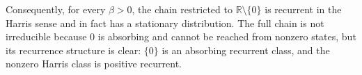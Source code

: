 \documentclass[11pt]{article}
\newcommand{\1}{\mathbf{1}}
\begin{document}
Consequently, for every $\beta>0$, the chain restricted to
$\mathbb{R}\setminus\{0\}$ is recurrent in the Harris sense and in fact
has a stationary distribution.  The full chain is not irreducible
because $0$ is absorbing and cannot be reached from nonzero states, but
its recurrence structure is clear: $\{0\}$ is an absorbing recurrent
class, and the nonzero Harris class is positive recurrent.
\end{document}
